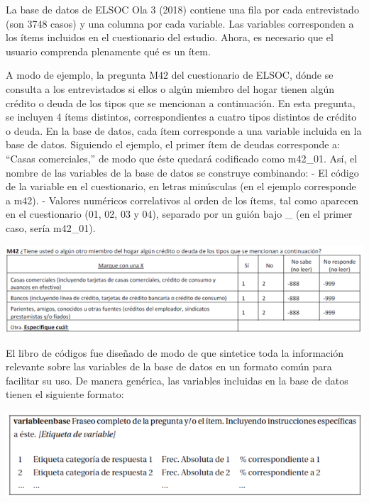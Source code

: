 \documentclass[
  openany]{book}
\let\origfigure\figure
\let\endorigfigure\endfigure
\renewenvironment{figure}[1][2] {
    \expandafter\origfigure\expandafter[H]
} {
    \endorigfigure
}
\begin{document}
La base de datos de ELSOC Ola 3 (2018) contiene una fila por cada entrevistado (son 3748 casos) y una columna por cada variable. Las variables corresponden a los ítems incluidos en el cuestionario del estudio. Ahora, es necesario que el usuario comprenda plenamente qué es un ítem.

A modo de ejemplo, la pregunta M42 del cuestionario de ELSOC, dónde se consulta a los entrevistados si ellos o algún miembro del hogar tienen algún crédito o deuda de los tipos que se mencionan a continuación. En esta pregunta, se incluyen 4 ítems distintos, correspondientes a cuatro tipos distintos de crédito o deuda. En la base de datos, cada ítem corresponde a una variable incluida en la base de datos. Siguiendo el ejemplo, el primer ítem de deudas corresponde a: ``Casas comerciales,'' de modo que éste quedará codificado como m42\_01. Así, el nombre de las variables de la base de datos se construye combinando:
- El código de la variable en el cuestionario, en letras minúsculas (en el ejemplo corresponde a m42).
- Valores numéricos correlativos al orden de los ítems, tal como aparecen en el cuestionario (01, 02, 03 y 04), separado por un guión bajo \_ (en el primer caso, sería m42\_01).

\begin{figure}
\centering
\includegraphics{../Imagenes/Figura_item_2018a.png}
\caption{\label{fig:item} Ejemplo de Pregunta con Múltiples Ítemes en ELSOC}
\end{figure}

El libro de códigos fue diseñado de modo de que sintetice toda la información relevante sobre las variables de la base de datos en un formato común para facilitar su uso. De manera genérica, las variables incluidas en la base de datos tienen el siguiente formato:

\begin{figure}
\centering
\includegraphics{../Imagenes/Figura_item_2018b.png}
\caption{\label{fig:item} Ejemplo de Pregunta con Múltiples Ítemes en ELSOC}
\end{figure}
\end{document}
